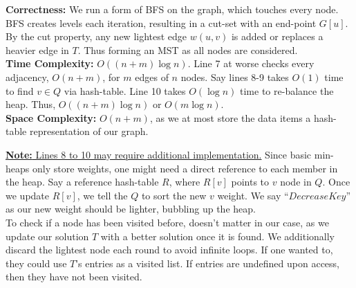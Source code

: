 \begin{Func}
    \noindent
    \textbf{Correctness:} We run a form of BFS on the graph, which touches every node. BFS creates levels each iteration, resulting in a cut-set with an end-point $G[u]$.
    By the cut property, any new lightest edge $w(u,v)$ is added or replaces a heavier edge in $T$. Thus forming an MST as all nodes are considered.\\
    \textbf{Time Complexity:} $O((n+m)\log n)$. Line 7 at worse checks every adjacency, $O(n+m)$, for $m$ edges of $n$ nodes. 
    Say lines 8-9 takes $O(1)$ time to find $v\in Q$ via hash-table. Line 10 takes $O(\log n)$ time to re-balance the heap.
    Thus, $O((n+m)\log n)$ or $O(m\log n)$.\\
    \textbf{Space Complexity:} $O(n+m)$, as we at most store the data items a hash-table representation of our graph.
\end{Func}

\noindent
\underline{\textbf{Note:} Lines 8 to 10 may require additional implementation.} Since basic min-heaps only store weights, one 
might need a direct reference to each member in the heap. Say a reference hash-table $R$, where $R[v]$ 
points to $v$ node in $Q$. Once we update $R[v]$, we tell the $Q$ to sort the new $v$ weight. We say
``$DecreaseKey$'' as our new weight should be lighter, bubbling up the heap.\\

\noindent
To check if a node has been visited before, doesn't matter in our case, as we update our solution $T$ with 
a better solution once it is found. We additionally discard the lightest node each round to avoid infinite loops. If one wanted to, they could use $T$'s entries as a visited list. If entries are
undefined upon access, then they have not been visited.\\

\newpage 

